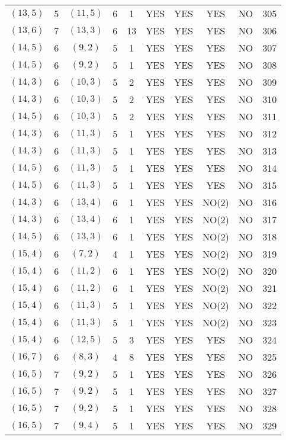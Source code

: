 \begin{longtable}{|c|c|c|c|c|c|c|c|c|c|}
$(13, 5)$ & 5 & $(11, 5)$ & 6 & 1 & YES & YES & YES & NO & 305\\
$(13, 6)$ & 7 & $(13, 3)$ & 6 & 13 & YES & YES & YES & NO & 306\\
$(14, 5)$ & 6 & $(9, 2)$ & 5 & 1 & YES & YES & YES & NO & 307\\
$(14, 5)$ & 6 & $(9, 2)$ & 5 & 1 & YES & YES & YES & NO & 308\\
$(14, 3)$ & 6 & $(10, 3)$ & 5 & 2 & YES & YES & YES & NO & 309\\
$(14, 3)$ & 6 & $(10, 3)$ & 5 & 2 & YES & YES & YES & NO & 310\\
$(14, 5)$ & 6 & $(10, 3)$ & 5 & 2 & YES & YES & YES & NO & 311\\
$(14, 3)$ & 6 & $(11, 3)$ & 5 & 1 & YES & YES & YES & NO & 312\\
$(14, 3)$ & 6 & $(11, 3)$ & 5 & 1 & YES & YES & YES & NO & 313\\
$(14, 5)$ & 6 & $(11, 3)$ & 5 & 1 & YES & YES & YES & NO & 314\\
$(14, 5)$ & 6 & $(11, 3)$ & 5 & 1 & YES & YES & YES & NO & 315\\
$(14, 3)$ & 6 & $(13, 4)$ & 6 & 1 & YES & YES & NO(2) & NO & 316\\
$(14, 3)$ & 6 & $(13, 4)$ & 6 & 1 & YES & YES & NO(2) & NO & 317\\
$(14, 5)$ & 6 & $(13, 3)$ & 6 & 1 & YES & YES & NO(2) & NO & 318\\
$(15, 4)$ & 6 & $(7, 2)$ & 4 & 1 & YES & YES & NO(2) & NO & 319\\
$(15, 4)$ & 6 & $(11, 2)$ & 6 & 1 & YES & YES & NO(2) & NO & 320\\
$(15, 4)$ & 6 & $(11, 2)$ & 6 & 1 & YES & YES & NO(2) & NO & 321\\
$(15, 4)$ & 6 & $(11, 3)$ & 5 & 1 & YES & YES & NO(2) & NO & 322\\
$(15, 4)$ & 6 & $(11, 3)$ & 5 & 1 & YES & YES & NO(2) & NO & 323\\
$(15, 4)$ & 6 & $(12, 5)$ & 5 & 3 & YES & YES & YES & NO & 324\\
$(16, 7)$ & 6 & $(8, 3)$ & 4 & 8 & YES & YES & YES & NO & 325\\
$(16, 5)$ & 7 & $(9, 2)$ & 5 & 1 & YES & YES & YES & NO & 326\\
$(16, 5)$ & 7 & $(9, 2)$ & 5 & 1 & YES & YES & YES & NO & 327\\
$(16, 5)$ & 7 & $(9, 2)$ & 5 & 1 & YES & YES & YES & NO & 328\\
$(16, 5)$ & 7 & $(9, 4)$ & 5 & 1 & YES & YES & YES & NO & 329\\

\end{longtable}
